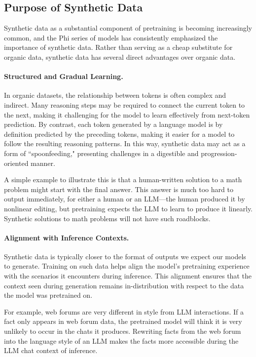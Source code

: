 \documentclass[11pt]{article}
\begin{document}
\subsection{Purpose of Synthetic Data}

Synthetic data as a substantial component of pretraining is becoming increasingly common, and the Phi series of models has consistently emphasized the importance of synthetic data.  Rather than serving as a cheap substitute for organic data, synthetic data has several direct advantages over organic data.

\paragraph{Structured and Gradual Learning.} In organic datasets, the relationship between tokens is often complex and indirect. Many reasoning steps may be required to connect the current token to the next, making it challenging for the model to learn effectively from next-token prediction. By contrast, each token generated by a language model is by definition predicted by the preceding tokens, making it easier for a model to follow the resulting reasoning patterns. In this way, synthetic data may act as a form of ``spoonfeeding," presenting challenges in a digestible and progression-oriented manner.

A simple example to illustrate this is that a human-written solution to a math problem might start with the final answer.  This answer is much too hard to output immediately, for either a human or an LLM---the human produced it by nonlinear editing, but pretraining expects the LLM to learn to produce it linearly.  Synthetic solutions to math problems will not have such roadblocks.


\paragraph{Alignment with Inference Contexts.} Synthetic data is typically closer to the format of outputs we expect our models to generate. Training on such data helps align the model’s pretraining experience with the scenarios it encounters during inference. This alignment ensures that the context seen during generation remains in-distribution with respect to the data the model was pretrained on.

For example, web forums are very different in style from LLM interactions.  If a fact only appears in web forum data, the pretrained model will think it is very unlikely to occur in the chats it produces.  Rewriting facts from the web forum into the language style of an LLM makes the facts more accessible during the LLM chat context of inference.
\end{document}
